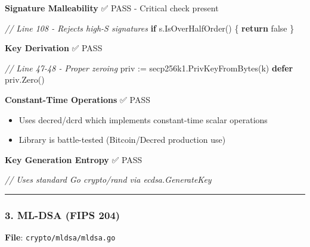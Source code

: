 \documentclass[
]{article}
\newenvironment{Shaded}{}{}
\newcommand{\CommentTok}[1]{\textcolor[rgb]{0.38,0.63,0.69}{\textit{#1}}}
\newcommand{\ControlFlowTok}[1]{\textcolor[rgb]{0.00,0.44,0.13}{\textbf{#1}}}
\newcommand{\NormalTok}[1]{#1}
\newcommand{\OperatorTok}[1]{\textcolor[rgb]{0.40,0.40,0.40}{#1}}
\newcommand{\OtherTok}[1]{\textcolor[rgb]{0.00,0.44,0.13}{#1}}
\providecommand{\tightlist}{%
  \setlength{\itemsep}{0pt}\setlength{\parskip}{0pt}}
\begin{document}
\textbf{Signature Malleability} ✅ PASS - Critical check present

\begin{Shaded}
\begin{Highlighting}[]
\CommentTok{// Line 108 {-} Rejects high{-}S signatures}
\ControlFlowTok{if}\NormalTok{ s}\OperatorTok{.}\NormalTok{IsOverHalfOrder}\OperatorTok{()} \OperatorTok{\{}
    \ControlFlowTok{return} \OtherTok{false}
\OperatorTok{\}}
\end{Highlighting}
\end{Shaded}

\textbf{Key Derivation} ✅ PASS

\begin{Shaded}
\begin{Highlighting}[]
\CommentTok{// Line 47{-}48 {-} Proper zeroing}
\NormalTok{priv }\OperatorTok{:=}\NormalTok{ secp256k1}\OperatorTok{.}\NormalTok{PrivKeyFromBytes}\OperatorTok{(}\NormalTok{k}\OperatorTok{)}
\ControlFlowTok{defer}\NormalTok{ priv}\OperatorTok{.}\NormalTok{Zero}\OperatorTok{()}
\end{Highlighting}
\end{Shaded}

\textbf{Constant-Time Operations} ✅ PASS

\begin{itemize}
\tightlist
\item
  Uses decred/dcrd which implements constant-time scalar operations
\item
  Library is battle-tested (Bitcoin/Decred production use)
\end{itemize}

\textbf{Key Generation Entropy} ✅ PASS

\begin{Shaded}
\begin{Highlighting}[]
\CommentTok{// Uses standard Go crypto/rand via ecdsa.GenerateKey}
\end{Highlighting}
\end{Shaded}

\begin{center}\rule{0.5\linewidth}{0.5pt}\end{center}

\subsubsection{3. ML-DSA (FIPS 204)}\label{3-ml-dsa-fips-204}

\textbf{File}: \texttt{crypto/mldsa/mldsa.go}
\end{document}
